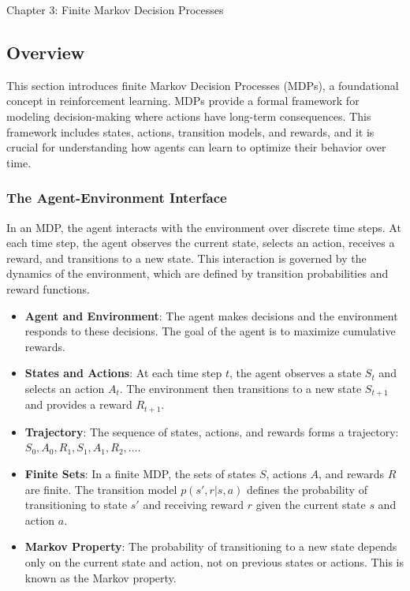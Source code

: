 \begin{notes}{Chapter 3: Finite Markov Decision Processes}
    \subsection*{Overview}

    This section introduces finite Markov Decision Processes (MDPs), a foundational concept in reinforcement learning. MDPs provide a formal framework for modeling decision-making where actions have 
    long-term consequences. This framework includes states, actions, transition models, and rewards, and it is crucial for understanding how agents can learn to optimize their behavior over time.
    
    \subsubsection*{The Agent-Environment Interface}
    
    In an MDP, the agent interacts with the environment over discrete time steps. At each time step, the agent observes the current state, selects an action, receives a reward, and transitions to a 
    new state. This interaction is governed by the dynamics of the environment, which are defined by transition probabilities and reward functions.
    
    \begin{highlight}
    
        \begin{itemize}
            \item \textbf{Agent and Environment}: The agent makes decisions and the environment responds to these decisions. The goal of the agent is to maximize cumulative rewards.
            \item \textbf{States and Actions}: At each time step \(t\), the agent observes a state \(S_t\) and selects an action \(A_t\). The environment then transitions to a new state \(S_{t+1}\) 
            and provides a reward \(R_{t+1}\).
            \item \textbf{Trajectory}: The sequence of states, actions, and rewards forms a trajectory: \(S_0, A_0, R_1, S_1, A_1, R_2, \ldots\).
            \item \textbf{Finite Sets}: In a finite MDP, the sets of states \(S\), actions \(A\), and rewards \(R\) are finite. The transition model \(p(s', r | s, a)\) defines the probability of 
            transitioning to state \(s'\) and receiving reward \(r\) given the current state \(s\) and action \(a\).
            \item \textbf{Markov Property}: The probability of transitioning to a new state depends only on the current state and action, not on previous states or actions. This is known as the Markov property.
        \end{itemize}
    

\end{highlight}
\end{notes}
